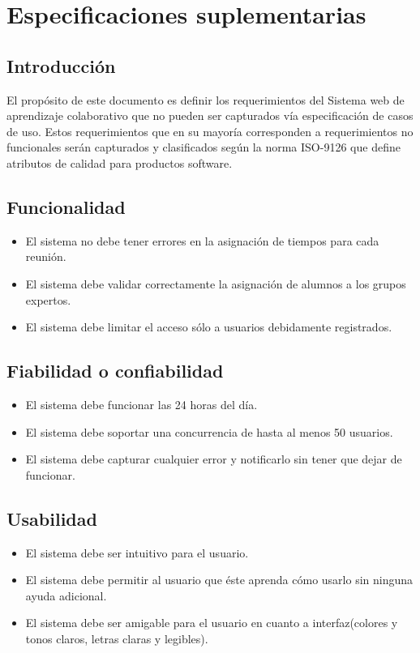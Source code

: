 \chapter{Especificaciones suplementarias}\label{apendice.B}
\section{Introducción}
El propósito de este documento es definir los requerimientos del Sistema web de aprendizaje colaborativo que no pueden ser capturados vía especificación de casos de uso. Estos requerimientos que en su mayoría corresponden a requerimientos no funcionales serán capturados y clasificados según la norma ISO-9126 que define atributos de calidad para productos software.
\section{Funcionalidad} 
\begin{itemize}
\item El sistema no debe tener errores en la asignación de tiempos para cada reunión.
\item El sistema debe validar correctamente la asignación de alumnos a los grupos expertos.
\item El sistema debe limitar el acceso sólo a usuarios debidamente registrados.
\end{itemize}
\section{Fiabilidad o confiabilidad} 
\begin{itemize}
\item El sistema debe funcionar las 24 horas del día.
\item El sistema debe soportar una concurrencia de hasta al menos 50 usuarios.
\item El sistema debe capturar cualquier error y notificarlo sin tener que dejar de funcionar.
\end{itemize}
\section{Usabilidad} 
\begin{itemize}
\item El sistema debe ser intuitivo para el usuario.
\item El sistema debe permitir al usuario que éste aprenda cómo usarlo sin ninguna ayuda adicional.
\item El sistema debe ser amigable para el usuario en cuanto a interfaz(colores y tonos claros, letras claras y legibles).
\end{itemize}
